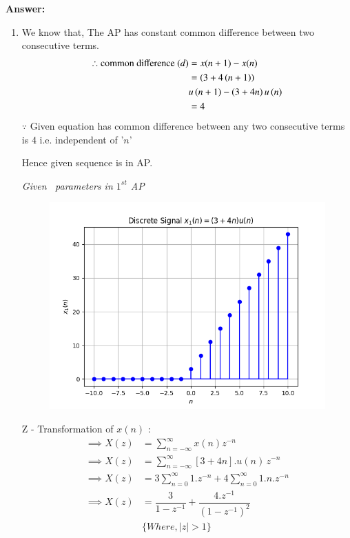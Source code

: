 \documentclass[journal,12pt,twocolumn]{IEEEtran}
\theoremstyle{remark}
\begin{document}
\vspace{0.5cm}
\textbf{Answer:} 
\begin{enumerate} [label=(\roman*)]
    \item We know that, The AP has constant common difference between two consecutive terms.
    \begin{align}
        \therefore \text{common difference } (d) &= x(n+1) - x(n) \\
        &= \left(3+4\left(n+1\right)\right) \nonumber\\
        & u\left(n+1\right) -\left(3+4n\right)u\left(n\right) \nonumber\\
        &= 4
    \end{align}
   $\because$ Given equation has common difference between any two consecutive terms is $4$ i.e. independent of '$n$'
   \begin{center}
       Hence given sequence is in AP.
   \end{center}
   \vspace{0.3cm}

    \begin{table}[htbp] 
    \centering
    
    \caption{\normalsize\textsl{Given \, parameters in $1^{st}$ AP}}
    \label{given parameters list}
    \end{table}

    \begin{figure}[!h] 
    \centering
    \includegraphics[width=\columnwidth]{figs/signal_x1.png}
    \caption{}
    \label{fig:Graph1}
    \end{figure}
     Z - Transformation of $x(n)$ :
    \begin{align}
        \implies X(z) &= \sum_{n = -\infty}^{\infty} x(n) z^{-n} \label{eq:z-transform}\\
        \implies  X(z) &= \sum_{n = -\infty}^{\infty}[3 + 4n].u(n) \, z^{-n} \\
        \implies X(z) &= 3 \sum_{n = 0}^{\infty} 1.z^{-n} + 4 \sum_{n = 0}^{\infty} 1.n.z^{-n} \\
        \implies X(z) &= \dfrac{3}{1-z^{-1}} + \dfrac{4.z^{-1}}{(1-z^{-1})^2}\\
        &\{ Where, |z|>1\} \nonumber
    \end{align}
    

\end{enumerate}
\end{document}
